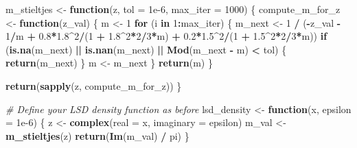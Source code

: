 \documentclass[
]{article}
\newenvironment{Shaded}{\begin{snugshade}}{\end{snugshade}}
\newcommand{\AttributeTok}[1]{\textcolor[rgb]{0.13,0.29,0.53}{#1}}
\newcommand{\CommentTok}[1]{\textcolor[rgb]{0.56,0.35,0.01}{\textit{#1}}}
\newcommand{\ControlFlowTok}[1]{\textcolor[rgb]{0.13,0.29,0.53}{\textbf{#1}}}
\newcommand{\DecValTok}[1]{\textcolor[rgb]{0.00,0.00,0.81}{#1}}
\newcommand{\FloatTok}[1]{\textcolor[rgb]{0.00,0.00,0.81}{#1}}
\newcommand{\FunctionTok}[1]{\textcolor[rgb]{0.13,0.29,0.53}{\textbf{#1}}}
\newcommand{\NormalTok}[1]{#1}
\newcommand{\OtherTok}[1]{\textcolor[rgb]{0.56,0.35,0.01}{#1}}
\newcommand{\SpecialCharTok}[1]{\textcolor[rgb]{0.81,0.36,0.00}{\textbf{#1}}}
\begin{document}
\begin{Shaded}
\begin{Highlighting}[]
\NormalTok{m\_stieltjes }\OtherTok{\textless{}{-}} \ControlFlowTok{function}\NormalTok{(z, }\AttributeTok{tol =} \FloatTok{1e{-}6}\NormalTok{, }\AttributeTok{max\_iter =} \DecValTok{1000}\NormalTok{) \{}
\NormalTok{  compute\_m\_for\_z }\OtherTok{\textless{}{-}} \ControlFlowTok{function}\NormalTok{(z\_val) \{}
\NormalTok{    m }\OtherTok{\textless{}{-}} \DecValTok{1}
    \ControlFlowTok{for}\NormalTok{ (i }\ControlFlowTok{in} \DecValTok{1}\SpecialCharTok{:}\NormalTok{max\_iter) \{}
\NormalTok{      m\_next }\OtherTok{\textless{}{-}} \DecValTok{1} \SpecialCharTok{/}\NormalTok{ (}\SpecialCharTok{{-}}\NormalTok{z\_val }\SpecialCharTok{{-}} \DecValTok{1}\SpecialCharTok{/}\NormalTok{m }\SpecialCharTok{+} \FloatTok{0.8}\SpecialCharTok{*}\FloatTok{1.8}\SpecialCharTok{\^{}}\DecValTok{2}\SpecialCharTok{/}\NormalTok{(}\DecValTok{1} \SpecialCharTok{+} \FloatTok{1.8}\SpecialCharTok{\^{}}\DecValTok{2}\SpecialCharTok{*}\DecValTok{2}\SpecialCharTok{/}\DecValTok{3}\SpecialCharTok{*}\NormalTok{m) }\SpecialCharTok{+} \FloatTok{0.2}\SpecialCharTok{*}\FloatTok{1.5}\SpecialCharTok{\^{}}\DecValTok{2}\SpecialCharTok{/}\NormalTok{(}\DecValTok{1} \SpecialCharTok{+} \FloatTok{1.5}\SpecialCharTok{\^{}}\DecValTok{2}\SpecialCharTok{*}\DecValTok{2}\SpecialCharTok{/}\DecValTok{3}\SpecialCharTok{*}\NormalTok{m))}
      \ControlFlowTok{if}\NormalTok{ (}\FunctionTok{is.na}\NormalTok{(m\_next) }\SpecialCharTok{||} \FunctionTok{is.nan}\NormalTok{(m\_next) }\SpecialCharTok{||} \FunctionTok{Mod}\NormalTok{(m\_next }\SpecialCharTok{{-}}\NormalTok{ m) }\SpecialCharTok{\textless{}}\NormalTok{ tol) \{}
        \FunctionTok{return}\NormalTok{(m\_next)}
\NormalTok{      \}}
\NormalTok{      m }\OtherTok{\textless{}{-}}\NormalTok{ m\_next}
\NormalTok{    \}}
    \FunctionTok{return}\NormalTok{(m)}
\NormalTok{  \}}
  
  \FunctionTok{return}\NormalTok{(}\FunctionTok{sapply}\NormalTok{(z, compute\_m\_for\_z))}
\NormalTok{\}}


\CommentTok{\# Define your LSD density function as before}
\NormalTok{lsd\_density }\OtherTok{\textless{}{-}} \ControlFlowTok{function}\NormalTok{(x, }\AttributeTok{epsilon =} \FloatTok{1e{-}6}\NormalTok{) \{}
\NormalTok{  z }\OtherTok{\textless{}{-}} \FunctionTok{complex}\NormalTok{(}\AttributeTok{real =}\NormalTok{ x, }\AttributeTok{imaginary =}\NormalTok{ epsilon)}
\NormalTok{  m\_val }\OtherTok{\textless{}{-}} \FunctionTok{m\_stieltjes}\NormalTok{(z)}
  \FunctionTok{return}\NormalTok{(}\FunctionTok{Im}\NormalTok{(m\_val) }\SpecialCharTok{/}\NormalTok{ pi)}
\NormalTok{\}}


\end{Highlighting}
\end{Shaded}
\end{document}
